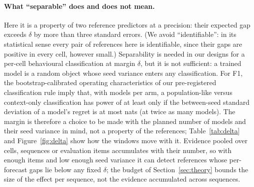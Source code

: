 \paragraph{What ``separable'' does and does not mean.} Here it is a property of two reference predictors at a precision:
their expected gap exceeds $\delta$ by more than three standard errors. (We avoid ``identifiable'': in its statistical sense
every pair of references here is identifiable, since their gaps are positive in every cell, however small.) Separability is
needed in our designs for a per-cell behavioural classification at margin $\delta$, but it is not sufficient: a trained
model is a random object whose seed variance enters any classification. For F1, the bootstrap-calibrated operating
characteristics of our pre-registered classification rule imply that, with \MinModels models per arm, a population-like
versus context-only classification has power of at least \LookupPower only if the between-seed standard deviation of a model's
regret is at most \LookupQoneThirtyTwo nats (\LookupQoneSixtyFour at twice as many models). The margin is therefore a
choice to be made with the planned number of models and their seed variance in mind, not a property of the references;
Table~\ref{tab:delta} and Figure~\ref{fig:delta} show how the windows move with it. Evidence pooled over cells, sequences or
evaluation items accumulates with their number, so with enough items and low enough seed variance it can detect references
whose per-forecast gaps lie below any fixed $\delta$; the budget of Section~\ref{sec:theory} bounds the size of the effect per
sequence, not the evidence accumulated across sequences.
